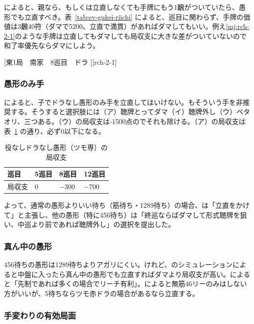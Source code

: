 \documentclass[10pt, twocolumn]{article}
\begin{document}
\citet[p. 165]{rb1}によると、親なら、もしくは立直しなくても手牌にもう1飜がついていたら、愚形でも立直すべき。表~\ref{tab:ev-gukei-riichi} によると、巡目に関わらず、手牌の価値は3飜40符（ダマで5200、立直で満貫）があればダマしてもいい。例え\ref{mj:rch-2-1}のような手牌は立直してもダマしても局収支に大きな差がついていないので和了率優先ならダマにしよう。

[東1局　南家　8巡目　ドラ ][rch-2-1]

\subsubsection*{愚形のみ手} 

\citet[p. 165]{rb1}によると、子でドラなし愚形のみ手を立直してはいけない。\citet[p. 30]{miinin-stat}もそういう手を非推奨する。そうすると選択肢には（ア）聴牌とってダマ（イ）聴牌外し（ウ）ベタオリ、三つある。（ウ）の局収支は-1500点のでそれも除ける\citep[][p. 30]{miinin-stat}。（ア）の局収支は表~\ref{tab:ev-tsumosen} の通り、必ず0以下になる。

\begin{table}[ht]
  \centering
  \begin{tabular}{llll}
    巡目 & 5巡目 & 8巡目 & 12巡目 \\
    \hline
    局収支 & 0 & $-$300 & $-$700
  \end{tabular}
  \caption{役なしドラなし愚形（ツモ専）の局収支\citep[][p. 32]{horiuchi}}
  \label{tab:ev-tsumosen}
\end{table}

よって、通常の愚形よりいい待ち（筋待ち・1289待ち）の場合、\citet[p. 30]{miinin-stat}は「立直をかけて」と主張し、他の愚形（特に456待ち）は「終巡ならばダマして形式聴牌を狙い、中巡より前であれば聴牌外し」の選択を提出した。

\subsubsection*{真ん中の愚形} 

456待ちの愚形は1289待ちよりアガリにくい。けれど、\citet{nisi-456kanchan}のシミュレーションによると中盤に入ったら真ん中の愚形でも立直すればダマより局収支が高い。\citet{ayataka}によると「先制であれば多くの場合でリーチ有利」。\citet[pp.~31--32]{ishibashi-black}によると無筋46リーのみはしない方がいいが、5待ちならツモ赤ドラの場合があるなら立直する。

\subsubsection*{手変わりの有効局面} 
\end{document}

